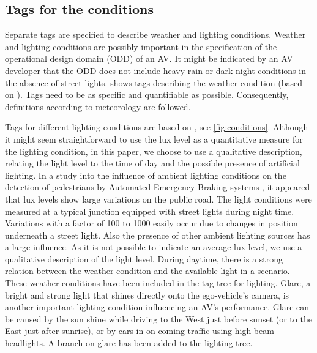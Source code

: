 \documentclass[twoside,twocolumn,9pt]{extarticle}
\theoremstyle{plain}
\begin{document}


\subsection{Tags for the conditions}
\label{sec:conditions}

Separate tags are specified to describe weather and lighting conditions. Weather and lighting conditions are possibly important in the specification of the operational design domain (ODD) of an AV. It might be indicated by an AV developer that the ODD does not include heavy rain or dark night conditions in the absence of street lights.  shows tags describing the weather condition (based on \cite{mahmassani2012use}). Tags need to be as specific and quantifiable as possible. Consequently, definitions according to meteorology are followed. 

Tags for different lighting conditions are based on \cite{golob2003relationships}, see \cref{fig:conditions}. Although it might seem straightforward to use the lux level as a quantitative measure for the lighting condition, in this paper, we choose to use a qualitative description, relating the light level to the time of day and the possible presence of artificial lighting. In a study into the influence of ambient lighting conditions on the detection of pedestrians by Automated Emergency Braking systems \autocite{wouters2013influence}, it appeared that lux levels show large variations on the public road. 
The light conditions were measured at a typical junction equipped with street lights during night time. Variations with a factor of 100 to 1000 easily occur due to changes in position underneath a street light. 
Also the presence of other ambient lighting sources has a large influence. As it is not possible to indicate an average lux level, we use a qualitative description of the light level. 
During daytime, there is a strong relation between the weather condition and the available light in a scenario. These weather conditions have been included in the tag tree for lighting.
Glare, a bright and strong light that shines directly onto the ego-vehicle's camera, is another important lighting condition influencing an AV's performance. Glare can be caused by the sun shine while driving to the West just before sunset (or to the East just after sunrise), or by cars in on-coming traffic using high beam headlights. A branch on glare has been added to the lighting tree.  
\end{document}
